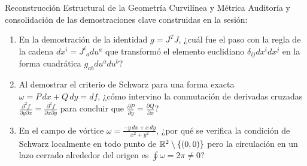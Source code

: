 \documentclass[10pt,aspectratio=169]{beamer}
\begin{document}
\begin{frame}{Reconstrucción Estructural de la Geometría Curvilínea y Métrica}
  \vspace{0.15cm}
  Auditoría y consolidación de las demostraciones clave construidas en la sesión:
  \vspace{0.3cm}
  \begin{enumerate}\itemsep14pt
    \item En la demostración de la identidad $g = J^T J$, ¿cuál fue el paso con la regla de la cadena $dx^i = J^i{}_a du^a$ que transformó el elemento euclidiano $\delta_{ij}dx^i dx^j$ en la forma cuadrática $g_{ab}du^a du^b$?
    \item Al demostrar el criterio de Schwarz para una forma exacta $\omega = P\,dx + Q\,dy = df$, ¿cómo intervino la conmutación de derivadas cruzadas $\frac{\partial^2 f}{\partial y \partial x} = \frac{\partial^2 f}{\partial x \partial y}$ para concluir que $\frac{\partial P}{\partial y} = \frac{\partial Q}{\partial x}$?
    \item En el campo de vórtice $\omega = \frac{-y\,dx + x\,dy}{x^2+y^2}$, ¿por qué se verifica la condición de Schwarz localmente en todo punto de $\mathbb{R}^2\setminus\{(0,0)\}$ pero la circulación en un lazo cerrado alrededor del origen es $\oint \omega = 2\pi \neq 0$?
  \end{enumerate}
\end{frame}
\end{document}
